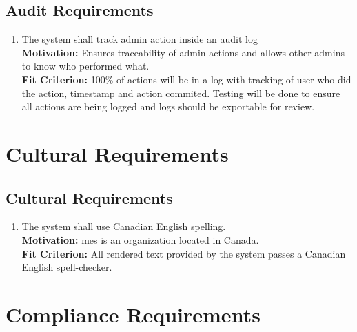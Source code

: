\documentclass[12pt]{article}
\begin{document}
\subsection{Audit Requirements}
\begin{enumerate}[align=left,
  leftmargin=*,
  labelsep=1em,
  itemindent=0em,
  label=\bfseries AU-\arabic*:,
  ref=\bfseries AU-\arabic*]
  \item \label{SAuR1} The system shall track admin action inside an audit log\\[2mm]
    {\bf Motivation:} Ensures traceability of admin actions and allows other admins to know who performed what.  \\
    {\bf Fit Criterion:} 100\% of actions will be in a log with tracking of user who did the action, timestamp and action commited. Testing will be done to ensure all actions are being logged and logs should be exportable for review.
\end{enumerate}

\section{Cultural Requirements}
\subsection{Cultural Requirements}
\begin{enumerate}[align=left,
  leftmargin=*,
  labelsep=1em,
  itemindent=0em,
  label=\bfseries CL-\arabic*:,
  ref=\bfseries CL-\arabic*]
  \item \label{CR1} The system shall use Canadian English spelling.\\[2mm]
    {\bf Motivation:} \Gls{mes} is an organization located in Canada.\\
    {\bf Fit Criterion:} All rendered text provided by the system passes a Canadian English spell-checker.\\
\end{enumerate}

\section{Compliance Requirements}
\end{document}
